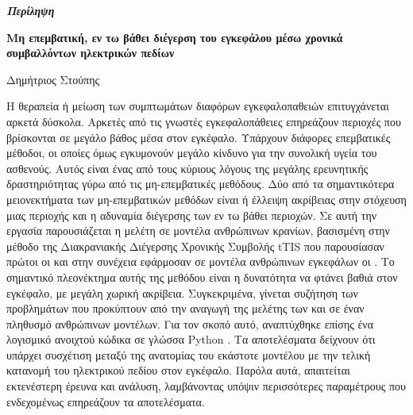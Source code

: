 \thispagestyle{plain}
\vspace*{\fill}
\begin{center}
    \LARGE
    \textit{\textbf{Περίληψη}}
        
    \vspace{0.4cm}
    \large
    \textbf{Μη επεμβατική, εν τω βάθει διέγερση του εγκεφάλου μέσω χρονικά συμβαλλόντων ηλεκτρικών πεδίων}
        
    \vspace{0.4cm}
    Δημήτριος Στούπης
\end{center}
\normalsize

\vspace{0.9cm}
Η θεραπεία ή μείωση των συμπτωμάτων διαφόρων εγκεφαλοπαθειών επιτυγχάνεται αρκετά δύσκολα. Αρκετές από τις γνωστές εγκεφαλοπάθειες επηρεάζουν περιοχές που βρίσκονται σε μεγάλο βάθος μέσα στον εγκέφαλο. Υπάρχουν διάφορες επεμβατικές μέθοδοι, οι οποίες όμως εγκυμονούν μεγάλο κίνδυνο για την συνολική υγεία του ασθενούς. Αυτός είναι ένας από τους κύριους λόγους της μεγάλης ερευνητικής δραστηριότητας γύρω από τις μη-επεμβατικές μεθόδους. Δύο από τα σημαντικότερα μειονεκτήματα των μη-επεμβατικών μεθόδων είναι ή έλλειψη ακρίβειας στην στόχευση μιας περιοχής και η αδυναμία διέγερσης των εν τω βάθει περιοχών. Σε αυτή την εργασία παρουσιάζεται η μελέτη σε μοντέλα ανθρώπινων κρανίων, βασισμένη στην μέθοδο της Διακρανιακής Διέγερσης Χρονικής Συμβολής \gls{tTIS} που παρουσίασαν πρώτοι οι  και στην συνέχεια εφάρμοσαν σε μοντέλα ανθρώπινων εγκεφάλων οι . Το σημαντικό πλεονέκτημα αυτής της μεθόδου είναι η δυνατότητα να φτάνει βαθιά στον εγκέφαλο, με μεγάλη χωρική ακρίβεια. Συγκεκριμένα, γίνεται συζήτηση των προβλημάτων που προκύπτουν από την αναγωγή της μελέτης των  και  σε έναν πληθυσμό ανθρώπινων μοντέλων. Για τον σκοπό αυτό, αναπτύχθηκε επίσης ένα λογισμικό ανοιχτού κώδικα σε γλώσσα Python \cite{thesis_repo}. Τα αποτελέσματα δείχνουν ότι υπάρχει συσχέτιση μεταξύ της ανατομίας του εκάστοτε μοντέλου με την τελική κατανομή του ηλεκτρικού πεδίου στον εγκέφαλο. Παρόλα αυτά, απαιτείται εκτενέστερη έρευνα και ανάλυση, λαμβάνοντας υπόψιν περισσότερες παραμέτρους που ενδεχομένως επηρεάζουν τα αποτελέσματα.
\vspace*{\fill}
